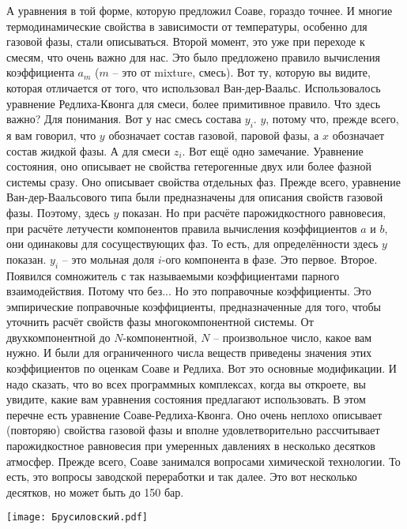 \documentclass[main.tex]{subfiles}
\begin{document}
А уравнения в той форме, которую предложил Соаве, гораздо точнее.
И многие термодинамические свойства в зависимости от температуры, особенно для газовой фазы, стали описываться.
Второй момент, это уже при переходе к смесям, что очень важно для нас.
Это было предложено правило вычисления коэффициента $a_m$ ($m$ -- это от mixture, смесь).
Вот ту, которую вы видите, которая отличается от того, что использовал Ван-дер-Ваальс.
Использовалось уравнение Редлиха-Квонга для смеси, более примитивное правило.
Что здесь важно?
Для понимания.
Вот у нас смесь состава $y_i$.
$y$, потому что, прежде всего, я вам говорил, что $y$ обозначает состав газовой, паровой фазы, а $x$ обозначает состав жидкой фазы.
А для смеси $z_i$.
Вот ещё одно замечание.
Уравнение состояния, оно описывает не свойства гетерогенные двух или более фазной системы сразу.
Оно описывает свойства отдельных фаз.
Прежде всего, уравнение Ван-дер-Ваальсового типа были предназначены для описания свойств газовой фазы.
Поэтому, здесь $y$ показан.
Но при расчёте парожидкостного равновесия, при расчёте летучести компонентов правила вычисления коэффициентов $a$ и $b$, они одинаковы для сосуществующих фаз.
То есть, для определённости здесь $y$ показан.
$y_i$ -- это мольная доля $i$-ого компонента в фазе.
Это первое.
Второе.
Появился сомножитель  с так называемыми коэффициентами парного взаимодействия.
Потому что без...
Но это поправочные коэффициенты.
Это эмпирические поправочные коэффициенты, предназначенные для того, чтобы уточнить расчёт свойств фазы многокомпонентной системы.
От двухкомпонентной до $N$-компонентной, $N$ -- произвольное число, какое вам нужно.
И были для ограниченного числа веществ приведены значения этих коэффициентов по оценкам Соаве и Редлиха.
Вот это основные модификации.
И надо сказать, что во всех программных комплексах, когда вы откроете, вы увидите, какие вам уравнения состояния предлагают использовать.
В этом перечне есть уравнение Соаве-Редлиха-Квонга.
Оно очень неплохо описывает (повторяю) свойства газовой фазы и вполне удовлетворительно рассчитывает парожидкостное равновесия при умеренных давлениях в несколько десятков атмосфер.
Прежде всего, Соаве занимался вопросами химической технологии.
То есть, это вопросы заводской переработки и так далее.
Это вот несколько десятков, но может быть до 150 бар.

\begin{center}
\texttt{[image: Брусиловский.pdf]}
\end{center}
\end{document}
